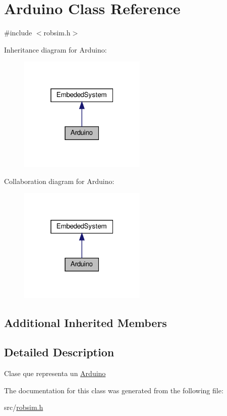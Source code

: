 \hypertarget{classArduino}{}\section{Arduino Class Reference}
\label{classArduino}


{\ttfamily \#include $<$robsim.\+h$>$}



Inheritance diagram for Arduino\+:\nopagebreak
\begin{figure}[H]
\begin{center}
\leavevmode
\includegraphics[width=172pt]{classArduino__inherit__graph}
\end{center}
\end{figure}


Collaboration diagram for Arduino\+:\nopagebreak
\begin{figure}[H]
\begin{center}
\leavevmode
\includegraphics[width=172pt]{classArduino__coll__graph}
\end{center}
\end{figure}
\subsection*{Additional Inherited Members}


\subsection{Detailed Description}
Clase que representa un \hyperlink{classArduino}{Arduino} 

The documentation for this class was generated from the following file\+:\begin{DoxyCompactItemize}
\item 
src/\hyperlink{robsim_8h}{robsim.\+h}\end{DoxyCompactItemize}
